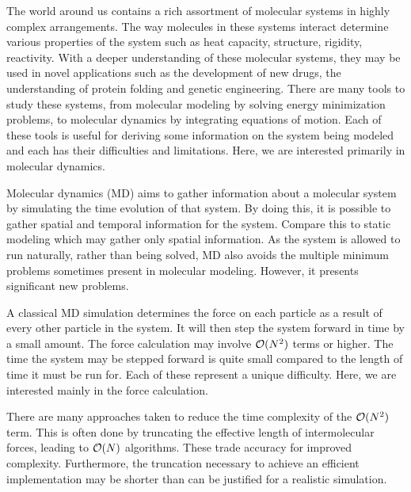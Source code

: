 %
%

%
The world around us contains
a rich assortment of molecular systems in
highly complex arrangements.
%
The way molecules in these systems interact determine various properties
of the system such as heat capacity, structure, rigidity, reactivity.
%
With a deeper understanding of these molecular systems,
they may be used in novel applications such as
the development of new drugs,
the understanding of protein folding and
genetic engineering.
%
There are many tools to study these systems,
from molecular modeling by solving energy minimization problems,
to molecular dynamics by integrating equations of motion.
%
Each of these tools is useful for
deriving some information on the system being modeled and
each has their difficulties and limitations.
%
Here, we are interested primarily in molecular dynamics.

Molecular dynamics (MD) aims to
gather information about a molecular system by
simulating the time evolution of that system.
%
By doing this, it is possible to
gather spatial and temporal information for the system.
%
Compare this to static modeling which may gather only spatial information.
%
As the system is allowed to run naturally, rather than being solved,
MD also avoids the multiple minimum problems
sometimes present in molecular modeling.
%
However, it presents significant new problems.


%
A classical MD simulation determines
the force on each particle as a result of
every other particle in the system.
%
It will then step the system forward in time by a small amount.
%
The force calculation may involve $\mathcal{O}{(N^2)}$ terms or higher.
%
The time the system may be stepped forward is
quite small compared to the length of time it must be run for.
%
Each of these represent a unique difficulty.
%
Here, we are interested mainly in the force calculation.


There are many approaches taken to reduce the time complexity of
the $\mathcal{O}{(N^2)}$ term.
%
This is often done by truncating the effective length of intermolecular
forces, leading to $\mathcal{O}{(N)}$ algorithms.
%
These trade accuracy for improved complexity.
%
Furthermore, the truncation necessary to achieve an efficient implementation
may be shorter than can be justified for a realistic simulation.

